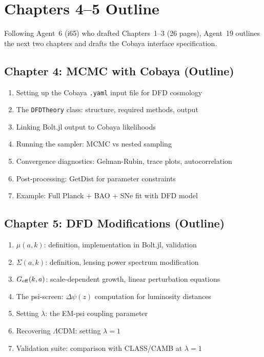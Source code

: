 \documentclass[11pt,a4paper]{article}
\begin{document}
\section{Chapters 4--5 Outline}

Following Agent~6 (i65) who drafted Chapters~1--3 (26 pages), Agent~19 outlines the next two chapters and drafts the Cobaya interface specification.

\subsection{Chapter 4: MCMC with Cobaya (Outline)}

\begin{enumerate}
\item Setting up the Cobaya \texttt{.yaml} input file for DFD cosmology
\item The \texttt{DFDTheory} class: structure, required methods, output
\item Linking Bolt.jl output to Cobaya likelihoods
\item Running the sampler: MCMC vs nested sampling
\item Convergence diagnostics: Gelman-Rubin, trace plots, autocorrelation
\item Post-processing: GetDist for parameter constraints
\item Example: Full Planck + BAO + SNe fit with DFD model
\end{enumerate}

\subsection{Chapter 5: DFD Modifications (Outline)}

\begin{enumerate}
\item $\mu(a,k)$: definition, implementation in Bolt.jl, validation
\item $\Sigma(a,k)$: definition, lensing power spectrum modification
\item $G_{\rm eff}(k,a)$: scale-dependent growth, linear perturbation equations
\item The psi-screen: $\Delta\psi(z)$ computation for luminosity distances
\item Setting $\lambda$: the EM-psi coupling parameter
\item Recovering $\Lambda$CDM: setting $\lambda = 1$
\item Validation suite: comparison with CLASS/CAMB at $\lambda = 1$
\end{enumerate}
\end{document}
